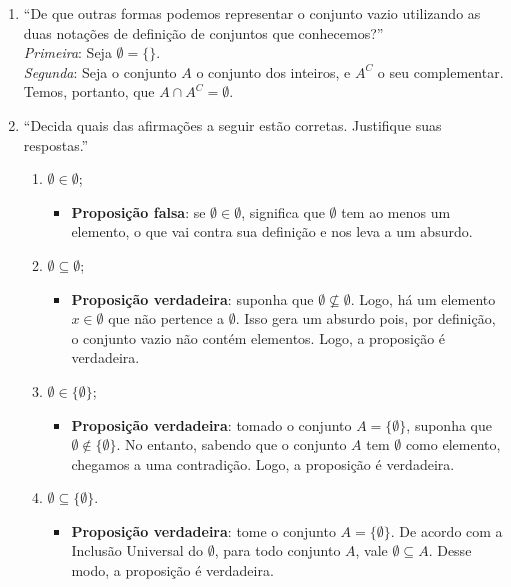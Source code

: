 \documentclass[13pt,letterpaper]{article}
\begin{document}
\begin{enumerate}
    \item 
        \enquote{De que outras formas podemos representar o conjunto vazio utilizando as duas notações de definição de conjuntos que conhecemos?}
        \\
        \emph{Primeira}: Seja $\emptyset = \{\}$. \\
        \emph{Segunda}: Seja o conjunto $A$ o conjunto dos inteiros, e $A^C$ o seu complementar. Temos, portanto, que $A \cap A^C = \emptyset$.
    \item \enquote{Decida quais das afirmações a seguir estão corretas. Justifique suas respostas.}
    \begin{enumerate}
        \item $\emptyset \in \emptyset$;
        \begin{itemize}
            \item \textbf{Proposição falsa}: se $\emptyset \in \emptyset$, significa que $\emptyset$ tem ao menos um elemento, o que vai contra sua definição e nos leva a um absurdo.
        \end{itemize}
        \item $\emptyset \subseteq \emptyset$;
        \begin{itemize}
            \item \textbf{Proposição verdadeira}: suponha que $\emptyset \nsubseteq \emptyset$. Logo, há um elemento $x \in \emptyset$ que não pertence a $\emptyset$. Isso gera um absurdo pois, por definição, o conjunto vazio não contém elementos. Logo, a proposição é verdadeira.
        \end{itemize}
        \item $\emptyset \in \{\emptyset\}$;
        \begin{itemize}
            \item \textbf{Proposição verdadeira}: tomado o conjunto $A = \{\emptyset\}$, suponha que $\emptyset \notin \{\emptyset\}$. No entanto, sabendo que o conjunto $A$ tem $\emptyset$ como elemento, chegamos a uma contradição. Logo, a proposição é verdadeira.
        \end{itemize}
        \item $\emptyset \subseteq \{\emptyset\}$.
        \begin{itemize}
            \item \textbf{Proposição verdadeira}: tome o conjunto $A = \{\emptyset\}$. De acordo com a Inclusão Universal do $\emptyset$, para todo conjunto $A$, vale $\emptyset \subseteq A$. Desse modo, a proposição é verdadeira.

\end{itemize}
\end{enumerate}
\end{enumerate}
\end{document}
